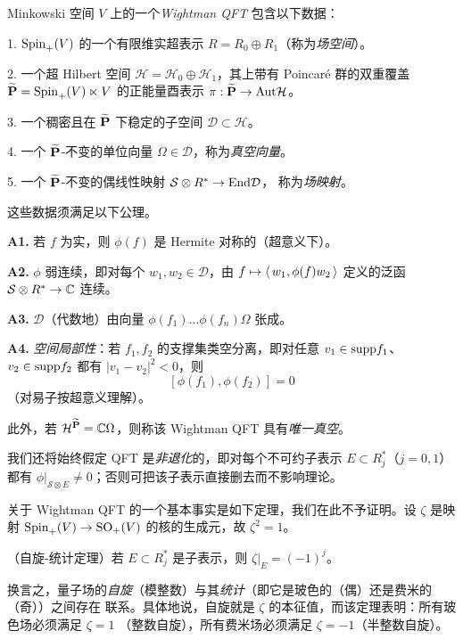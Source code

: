\begin{definition} Minkowski 空间 $V$ 上的一个\emph{Wightman QFT} 包含以下数据：

1. ${\rm Spin}_+(V)$ 的一个有限维实超表示 $R=R_0\oplus R_1$（称为\emph{场空间}）。

2. 一个超 Hilbert 空间 $\mathcal H=\mathcal H_0\oplus \mathcal H_1$，其上带有 Poincar\'e 群的双重覆盖
$\widetilde{\bold P}={\rm Spin}_+(V)\ltimes V$ 的正能量酉表示
$\pi: \widetilde{\bold P}\to {\rm Aut}\mathcal H$。

3. 一个稠密且在 $\widetilde{\bold P}$ 下稳定的子空间 $\mathcal D\subset \mathcal H$。

4. 一个 $\widetilde{\bold P}$-不变的单位向量 $\Omega\in \mathcal D$，称为\emph{真空向量}。

5. 一个 $\widetilde{\bold P}$-不变的偶线性映射 $\mathcal S\otimes R^*\to {\rm End}\mathcal D$，
称为\emph{场映射}。

这些数据须满足以下公理。

\textbf{A1.} 若 $f$ 为实，则 $\phi(f)$ 是 Hermite 对称的（超意义下）。

\textbf{A2.} $\phi$ 弱连续，即对每个 $w_1,w_2\in \mathcal D$，由
$f\mapsto \la w_1,\phi(f)w_2\ra$ 定义的泛函 $\mathcal S\otimes R^*\to \Bbb C$ 连续。

\textbf{A3.} $\mathcal D$（代数地）由向量 $\phi(f_1)...\phi(f_n)\Omega$ 张成。

\textbf{A4.} \emph{空间局部性}：若 $f_1,f_2$ 的支撑集类空分离，即对任意
$v_1\in {\rm supp}f_1$、$v_2\in {\rm supp}f_2$ 都有 $|v_1-v_2|^2<0$，则
$$
[\phi(f_1),\phi(f_2)]=0
$$ 
（对易子按超意义理解）。
\end{definition} 

此外，若 $\mathcal H^{\widetilde{\bold P}}=\Bbb C\Omega$，则称该 Wightman QFT 具有\emph{唯一真空}。

我们还将始终假定 QFT 是\emph{非退化}的，即对每个不可约子表示 $E\subset R^*_j$（$j=0,1$）都有
$\phi|_{\mathcal S\otimes E}\ne 0$；否则可把该子表示直接删去而不影响理论。

关于 Wightman QFT 的一个基本事实是如下定理，我们在此不予证明。设 $\zeta$ 是映射
${\rm Spin}_+(V)\to {\rm SO}_+(V)$ 的核的生成元，故 $\zeta^2=1$。

\begin{theorem}（自旋-统计定理）若 $E\subset R_j^*$ 是子表示，则 $\zeta|_E=(-1)^j$。
\end{theorem} 

换言之，量子场的\emph{自旋}（模整数）与其\emph{统计}（即它是玻色的（偶）还是费米的（奇））之间存在
联系。具体地说，自旋就是 $\zeta$ 的本征值，而该定理表明：所有玻色场必须满足 $\zeta=1$
（整数自旋），所有费米场必须满足 $\zeta=-1$（半整数自旋）。

